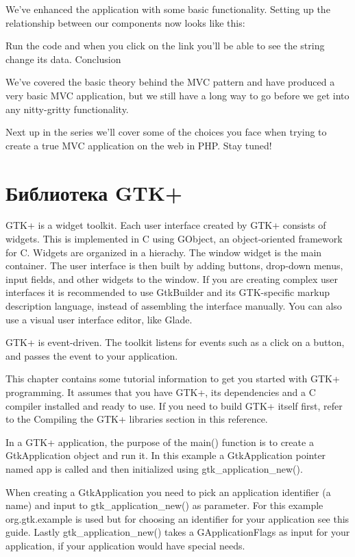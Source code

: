 \documentclass[a4paper,openany,twoside,final]{book}
\begin{document}
We’ve enhanced the application with some basic functionality. Setting up the relationship between our components now looks like this:

Run the code and when you click on the link you’ll be able to see the string change its data.
Conclusion

We’ve covered the basic theory behind the MVC pattern and have produced a very basic MVC application, but we still have a long way to go before we get into any nitty-gritty functionality.

Next up in the series we’ll cover some of the choices you face when trying to create a true MVC application on the web in PHP. Stay tuned!

\section{Библиотека GTK+}
\label{sec:gtk}

GTK+ is a widget toolkit. Each user interface created by GTK+ consists of widgets. This is implemented in C using GObject, an object-oriented framework for C. Widgets are organized in a hierachy. The window widget is the main container. The user interface is then built by adding buttons, drop-down menus, input fields, and other widgets to the window. If you are creating complex user interfaces it is recommended to use GtkBuilder and its GTK-specific markup description language, instead of assembling the interface manually. You can also use a visual user interface editor, like Glade.

GTK+ is event-driven. The toolkit listens for events such as a click on a button, and passes the event to your application.

This chapter contains some tutorial information to get you started with GTK+ programming. It assumes that you have GTK+, its dependencies and a C compiler installed and ready to use. If you need to build GTK+ itself first, refer to the Compiling the GTK+ libraries section in this reference.

In a GTK+ application, the purpose of the main() function is to create a GtkApplication object and run it. In this example a GtkApplication pointer named app is called and then initialized using gtk\_application\_new().

When creating a GtkApplication you need to pick an application identifier (a name) and input to gtk\_application\_new() as parameter. For this example org.gtk.example is used but for choosing an identifier for your application see this guide. Lastly gtk\_application\_new() takes a GApplicationFlags as input for your application, if your application would have special needs.
\end{document}
